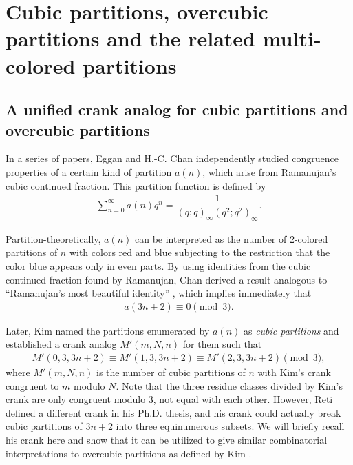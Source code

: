 \documentclass[12pt]{amsart}
\numberwithin{equation}{section}
\theoremstyle{plain}
\theoremstyle{definition}
\begin{document}
\section{Cubic partitions, overcubic partitions and the related multi-colored partitions}
\label{sec: cubic}
\subsection{A unified crank analog for cubic partitions and overcubic partitions}
In a series of papers, Eggan \cite{Egg} and H.-C. Chan \cite{Cha1,Cha2,Cha3} independently studied congruence properties of a certain kind of partition $a(n)$, which arise from Ramanujan's cubic continued fraction. This partition function is defined by
\begin{align*}
\sum_{n=0}^{\infty}a(n)q^{n}=\dfrac{1}{(q;q)_{\infty}(q^{2};q^{2})_{\infty}}.
\end{align*}

Partition-theoretically, $a(n)$ can be interpreted as the number of 2-colored partitions of $n$ with colors red and blue subjecting to the restriction that the color blue appears only in even parts. By using identities from the cubic continued fraction found by Ramanujan, Chan derived a result analogous to ``Ramanujan's most beautiful identity'' \cite{Ram}, which implies immediately that
\begin{align}\label{cubic-mod3}
a(3n+2)\equiv0\pmod{3}.
\end{align}

Later, Kim \cite{Kim2} named the partitions enumerated by $a(n)$ as \emph{cubic partitions} and established a crank analog $M'(m,N,n)$ for them such that
\begin{align*}
M'(0,3,3n+2)\equiv M'(1,3,3n+2)\equiv M'(2,3,3n+2)\pmod{3},
\end{align*}
where $M'(m,N,n)$ is the number of cubic partitions of $n$ with Kim's crank congruent to $m$ modulo $N$. Note that the three residue classes divided by Kim's crank are only congruent modulo $3$, not equal with each other. However, Reti \cite{Ret} defined a different crank in his Ph.D. thesis, and his crank could actually break cubic partitions of $3n+2$ into three equinumerous subsets. We will briefly recall his crank here and show that it can be utilized to give similar combinatorial interpretations to overcubic partitions as defined by Kim \cite{Kim4}.
\end{document}
